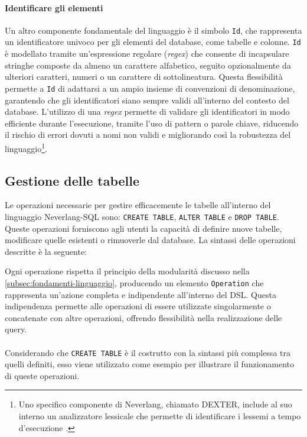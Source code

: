 \documentclass[12pt,a4paper,openright,twoside]{book}
\begin{document}
\paragraph{Identificare gli elementi}
Un altro componente fondamentale del linguaggio è il simbolo \texttt{Id}, che rappresenta un identificatore univoco per gli 
elementi del database, come tabelle e colonne. \texttt{Id} è modellato tramite un’espressione regolare (\textit{regex}) che consente 
di incapsulare stringhe composte da almeno un carattere alfabetico, seguito opzionalmente da ulteriori caratteri, numeri o un 
carattere di sottolineatura. Questa flessibilità permette a \texttt{Id} di adattarsi a un ampio insieme di convenzioni di 
denominazione, garantendo che gli identificatori siano sempre validi all’interno del contesto del database. L’utilizzo di una 
\textit{regex} permette di validare gli identificatori in modo efficiente durante l’esecuzione, tramite l’uso di pattern o parole 
chiave, riducendo il rischio di errori dovuti a nomi non validi e migliorando così la robustezza del linguaggio\footnote{Uno 
specifico componente di Neverlang, chiamato DEXTER, include al suo interno un analizzatore lessicale che permette di identificare 
i lessemi a tempo d’esecuzione \cite{Dexter2012, Vacchi2015}.}.


\subsection{Gestione delle tabelle}
Le operazioni necessarie per gestire efficacemente le tabelle all’interno del linguaggio Neverlang-SQL sono: \texttt{CREATE TABLE}, \texttt{ALTER 
TABLE} e \texttt{DROP TABLE}. Queste operazioni forniscono agli utenti la capacità di definire nuove tabelle, modificare quelle esistenti o 
rimuoverle dal database. La sintassi delle operazioni descritte è la seguente:


Ogni operazione rispetta il principio della modularità discusso nella \cref{subsec:fondamenti-linguaggio}, producendo un elemento 
\texttt{Operation} che rappresenta un’azione completa e indipendente all’interno del DSL. Questa indipendenza permette alle 
operazioni di essere utilizzate singolarmente o concatenate con altre operazioni, offrendo flessibilità nella realizzazione delle 
query.\\\\
Considerando che \texttt{CREATE TABLE} è il costrutto con la sintassi più complessa tra quelli definiti, esso viene utilizzato come esempio 
per illustrare il funzionamento di queste operazioni.
\end{document}
